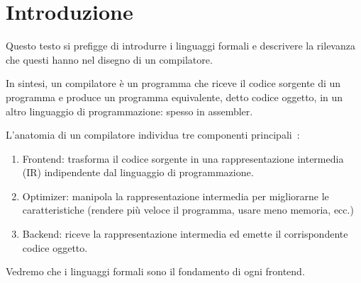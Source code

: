 \chapter{Introduzione}

Questo testo si prefigge di introdurre i linguaggi formali e descrivere la
rilevanza che questi hanno nel disegno di un compilatore.

In sintesi, un compilatore è un programma che riceve il codice sorgente di un
programma e produce un programma equivalente, detto codice oggetto, in un altro
linguaggio di programmazione: spesso in assembler.

L'anatomia di un compilatore individua tre componenti
principali~:
\begin{enumerate}
\item
      Frontend: trasforma il codice sorgente in una rappresentazione intermedia
      (IR) indipendente dal linguaggio di programmazione.
\item
      Optimizer: manipola la rappresentazione intermedia per migliorarne le
      caratteristiche (rendere più veloce il programma, usare meno memoria,
      ecc.)
\item
      Backend: riceve la rappresentazione intermedia ed emette il corrispondente
      codice oggetto.
\end{enumerate}

Vedremo che i linguaggi formali sono il fondamento di ogni frontend.

